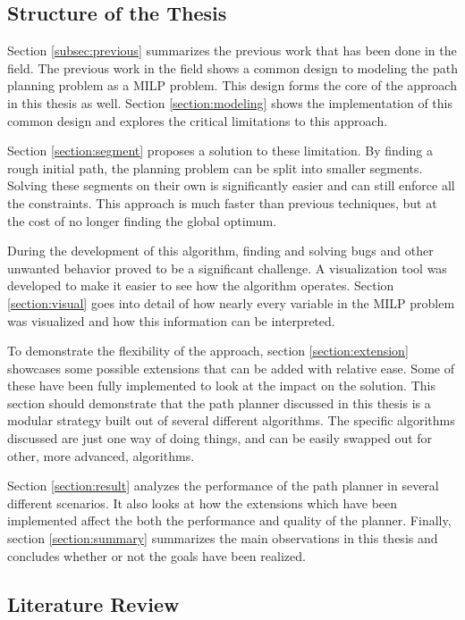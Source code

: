 \subsection{Structure of the Thesis}
Section \ref{subsec:previous} summarizes the previous work that has been done in the field.
The previous work in the field shows a common design to modeling the path planning problem as a MILP problem. This design forms the core of the approach in this thesis as well. Section \ref{section:modeling} shows the implementation of this common design and explores the critical limitations to this approach.
\par
Section \ref{section:segment} proposes a solution to these limitation. By finding a rough initial path, the planning problem can be split into smaller segments. Solving these segments on their own is significantly easier and can still enforce all the constraints. This approach is much faster than previous techniques, but at the cost of no longer finding the global optimum.
\par
During the development of this algorithm, finding and solving bugs and other unwanted behavior proved to be a significant challenge. A visualization tool was developed to make it easier to see how the algorithm operates. Section \ref{section:visual} goes into detail of how nearly every variable in the MILP problem was visualized and how this information can be interpreted.
\par
To demonstrate the flexibility of the approach, section \ref{section:extension} showcases some possible extensions that can be added with relative ease. Some of these have been fully implemented to look at the impact on the solution. This section should demonstrate that the path planner discussed in this thesis is a modular strategy built out of several different algorithms. The specific algorithms discussed are just one way of doing things, and can be easily swapped out for other, more advanced, algorithms. 
\par
Section \ref{section:result} analyzes the performance of the path planner in several different scenarios. It also looks at how the extensions which have been implemented affect the both the performance and quality of the planner.
Finally, section \ref{section:summary} summarizes the main observations in this thesis and concludes whether or not the goals have been realized.




\subsection{Literature Review}




